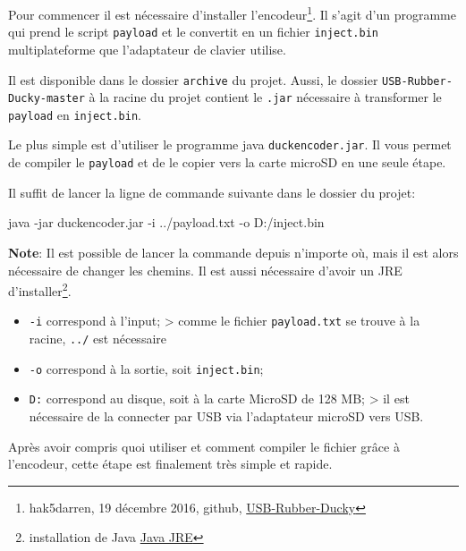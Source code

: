 \documentclass[
  french,
  paper=a4,
  ,captions=tableheading
]{scrartcl}
\newenvironment{Shaded}{\begin{snugshade}}{\end{snugshade}}
\newcommand{\FunctionTok}[1]{\textcolor[rgb]{0.00,0.00,0.00}{#1}}
\newcommand{\NormalTok}[1]{#1}
\providecommand{\tightlist}{%
  \setlength{\itemsep}{0pt}\setlength{\parskip}{0pt}}
\renewenvironment{quote}{\begin{customblockquote}\list{}{\rightmargin=0em\leftmargin=0em}%
\item\relax\color{blockquote-text}\ignorespaces}{\unskip\unskip\endlist\end{customblockquote}}
\begin{document}
Pour commencer il est nécessaire d'installer l'encodeur\footnote{hak5darren,
  19 décembre 2016, github,
  \href{https://github.com/hak5darren/USB-Rubber-Ducky}{USB-Rubber-Ducky}}.
Il s'agit d'un programme qui prend le script \texttt{payload} et le
convertit en un fichier \texttt{inject.bin} multiplateforme que
l'adaptateur de clavier utilise.

Il est disponible dans le dossier \texttt{archive} du projet. Aussi, le
dossier \texttt{USB-Rubber-Ducky-master} à la racine du projet contient
le \texttt{.jar} nécessaire à transformer le \texttt{payload} en
\texttt{inject.bin}.

Le plus simple est d'utiliser le programme java
\texttt{duckencoder.jar}. Il vous permet de compiler le \texttt{payload}
et de le copier vers la carte microSD en une seule étape.

Il suffit de lancer la ligne de commande suivante dans le dossier du
projet:

\begin{Shaded}
\begin{Highlighting}[]
\NormalTok{java {-}jar duckencoder.}\FunctionTok{jar}\NormalTok{  {-}i ../payload.}\FunctionTok{txt}\NormalTok{ {-}o D:/inject.}\FunctionTok{bin}
\end{Highlighting}
\end{Shaded}

\begin{quote}
\textbf{Note}: Il est possible de lancer la commande depuis n'importe
où, mais il est alors nécessaire de changer les chemins. Il est aussi
nécessaire d'avoir un JRE d'installer\footnote{installation de Java
  \href{https://www.java.com/fr/download/manual.jsp}{Java JRE}}.
\end{quote}

\begin{itemize}
\tightlist
\item
  \texttt{-i} correspond à l'input; \textgreater{} comme le fichier
  \texttt{payload.txt} se trouve à la racine, \texttt{../} est
  nécessaire
\item
  \texttt{-o} correspond à la sortie, soit \texttt{inject.bin};
\item
  \texttt{D:} correspond au disque, soit à la carte MicroSD de 128 MB;
  \textgreater{} il est nécessaire de la connecter par USB via
  l'adaptateur microSD vers USB.
\end{itemize}

Après avoir compris quoi utiliser et comment compiler le fichier grâce à
l'encodeur, cette étape est finalement très simple et rapide.
\end{document}
